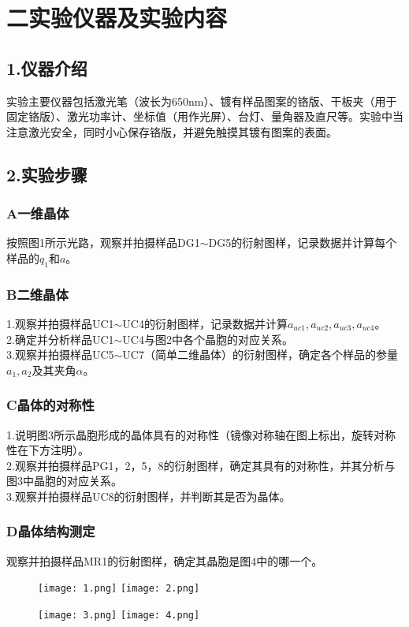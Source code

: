 \documentclass{ctexart}
\begin{document}
\section*{二\quad 实验仪器及实验内容}
\subsection*{1.\quad 仪器介绍}
实验主要仪器包括激光笔（波长为650nm）、镀有样品图案的铬版、干板夹（用于固定铬版）、激光功率计、坐标值（用作光屏）、台灯、量角器及直尺等。实验中当注意激光安全，同时小心保存铬版，并避免触摸其镀有图案的表面。
\subsection*{2.\quad 实验步骤}
\subsubsection*{A\quad 一维晶体}
\noindent 按照图1所示光路，观察并拍摄样品DG1$\sim$DG5的衍射图样，记录数据并计算每个样品的$q_1$和$a$。
\subsubsection*{B\quad 二维晶体}
\noindent 1.观察并拍摄样品UC1$\sim$UC4的衍射图样，记录数据并计算$a_{uc1},a_{uc2},a_{uc3},a_{uc4}$。\\
\noindent 2.确定并分析样品UC1$\sim$UC4与图2中各个晶胞的对应关系。\\
\noindent 3.观察并拍摄样品UC5$\sim$UC7（简单二维晶体）的衍射图样，确定各个样品的参量$a_1,a_2$及其夹角$\alpha$。
\subsubsection*{C\quad 晶体的对称性}
\noindent 1.说明图3所示晶胞形成的晶体具有的对称性（镜像对称轴在图上标出，旋转对称性在下方注明）。\\
\noindent 2.观察并拍摄样品PG1，2，5，8的衍射图样，确定其具有的对称性，并其分析与图3中晶胞的对应关系。\\
\noindent 3.观察并拍摄样品UC8的衍射图样，并判断其是否为晶体。
\subsubsection*{D\quad 晶体结构测定}
\noindent 观察并拍摄样品MR1的衍射图样，确定其晶胞是图4中的哪一个。
\begin{figure}[h]                                           
  \texttt{[image: 1.png]}
  \qquad
  \texttt{[image: 2.png]}
\end{figure}
\begin{figure}[h]                                           
  \texttt{[image: 3.png]}
  \qquad
  \texttt{[image: 4.png]}
\end{figure}
\end{document}
